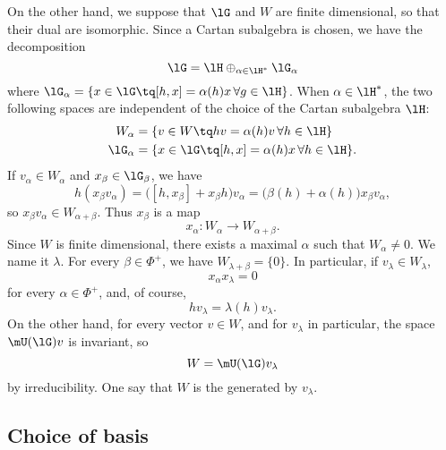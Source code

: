 On the other hand, we suppose that $\lG$ and $W$ are finite dimensional, so that their dual are isomorphic. Since a Cartan subalgebra is chosen, we have the decomposition
\begin{equation}
    \lG=\lH\oplus_{\alpha\in\lH^*}\lG_{\alpha}
\end{equation}
where $\lG_{\alpha}=\{ x\in\lG\tq [h,x]=\alpha(h)x\,\forall g\in\lH \}$. When $\alpha\in\lH^*$, the two following spaces are independent of the choice of the Cartan subalgebra $\lH$:
\begin{equation}
    \begin{aligned}
        W_{\alpha}  &=\{ v\in W \tq hv=\alpha(h)v\,\forall h\in\lH \}\\
        \lG_{\alpha}    &=\{ x\in\lG    \tq [h,x]=\alpha(h)x\,\forall h\in\lH \}.
    \end{aligned}
\end{equation}
If $v_{\alpha}\in W_{\alpha}$ and $x_{\beta}\in\lG_{\beta}$, we have
\begin{equation}
    h(x_{\beta}v_{\alpha})=\big( [h,x_{\beta}]+x_{\beta}h \big)v_{\alpha}=\big( \beta(h)+\alpha(h) \big)x_{\beta} v_{\alpha},
\end{equation}
so $x_{\beta}v_{\alpha}\in W_{\alpha+\beta}$. Thus $x_{\beta}$ is a map
\begin{equation}
    x_{\alpha}\colon W_{\alpha}\to W_{\alpha+\beta}.
\end{equation}
Since $W$ is finite dimensional, there exists a maximal $\alpha$ such that $W_{\alpha}\neq0$. We name it $\lambda$. For every $\beta\in\Phi^+$, we have $W_{\lambda+\beta}=\{ 0 \}$. In particular, if $v_{\lambda}\in W_{\lambda}$,
\begin{equation}
    x_{\alpha}x_{\lambda}=0
\end{equation}
for every $\alpha\in\Phi^+$, and, of course, 
\begin{equation}
    hv_{\lambda}=\lambda(h)v_{\lambda}.
\end{equation}
On the other hand, for every vector $v\in W$, and for $v_{\lambda}$ in particular, the space $\mU(\lG)v$ is invariant, so
\begin{equation}
    W=\mU(\lG)v_{\lambda}
\end{equation}
by irreducibility. One say that $W$ is the  generated by $v_{\lambda}$.


                    \subsection{Choice of basis}



